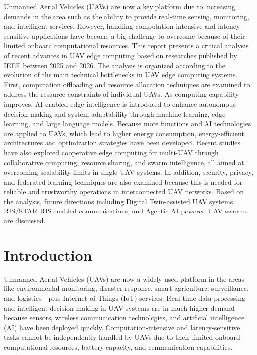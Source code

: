 \documentclass[a4paper, 12pt]{article}
\begin{document}
Unmanned Aerial Vehicles (UAVs) are now a key platform due to increasing demands in the area such as the ability to provide real-time sensing, monitoring, and intelligent services. However, handling computation-intensive and latency-sensitive applications have become a big challenge to overcome because of their limited onboard computational resources. This report presents a critical analysis of recent advances in UAV edge computing based on researches published by IEEE between 2025 and 2026. The analysis is organized according to the evolution of the main technical bottlenecks in UAV edge computing systems. First, computation offloading and resource allocation techniques are examined to address the resource constraints of individual UAVs. As computing capability improves, AI-enabled edge intelligence is introduced to enhance autonomous decision-making and system adaptability through machine learning, edge learning, and large language models. Because more functions and AI technologies are applied to UAVs, which lead to higher energy consumption, energy-efficient architectures and optimization strategies have been developed. Recent studies have also explored cooperative edge computing for multi-UAV through collaborative computing, resource sharing, and swarm intelligence, all aimed at overcoming scalability limits in single-UAV systems. In addition, security, privacy, and federated learning techniques are also examined because this is needed for reliable and trustworthy operations in interconnected UAV networks. Based on the analysis, future directions including Digital Twin-assisted UAV systems, RIS/STAR-RIS-enabled communications, and Agentic AI-powered UAV swarms are discussed.

\section*{Introduction}

 Unmanned Aerial Vehicles (UAVs) are now a widely used platform in the areas like environmental monitoring, disaster response, smart agriculture, surveillance, and logistics—plus Internet of Things (IoT) services. Real-time data processing and intelligent decision-making in UAV systems are in much higher demand because sensors, wireless communication technologies, and artificial intelligence (AI) have been deployed quickly. Computation-intensive and latency-sensitive tasks cannot be independently handled by UAVs due to their limited onboard computational resources, battery capacity, and communication capabilities.
\end{document}
